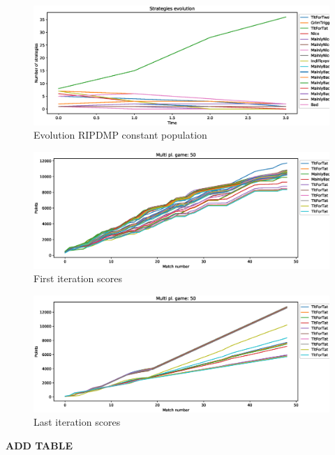\documentclass[journal,a4paper,10pt,twoside]{IEEEtran} %
\begin{document}
\begin{figure}[!ht]
    \centering
    \includegraphics[width=1\columnwidth]{../img/ripdmp-const/ripdmp-evolution-const-pop-50}
    \caption{Evolution RIPDMP constant population}
    \label{fig:constR}
\end{figure}

\begin{figure}[!ht]
    \centering
    \includegraphics[width=1\columnwidth]{../img/ripdmp-const/ripdmp-scores-const-pop-50-r0}
    \caption{First iteration scores}
    \label{fig:constFI}
\end{figure}

\begin{figure}[!ht]
    \centering
    \includegraphics[width=1\columnwidth]{../img/ripdmp-const/ripdmp-scores-const-pop-50-r3}
    \caption{Last iteration scores}
    \label{fig:constLI}
\end{figure}

\textbf{ADD TABLE}
\end{document}
